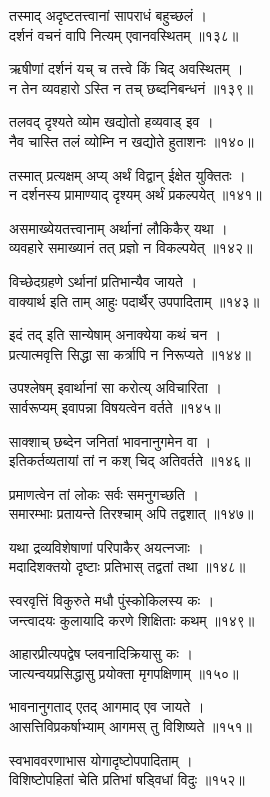 तस्माद् अदृष्टतत्त्वानां सापराधं बहुच्छलं ।\\दर्शनं वचनं वापि नित्यम् एवानवस्थितम् ॥१३८॥

ऋषीणां दर्शनं यच् च तत्त्वे किं चिद् अवस्थितम् ।\\न तेन व्यवहारो ऽस्ति न तच् छब्दनिबन्धनं ॥१३९॥

तलवद् दृश्यते व्योम खद्योतो हव्यवाड् इव ।\\नैव चास्ति तलं व्योम्नि न खद्योते हुताशनः ॥१४०॥

तस्मात् प्रत्यक्षम् अप्य् अर्थं विद्वान् ईक्षेत युक्तितः ।\\न दर्शनस्य प्रामाण्याद् दृश्यम् अर्थं प्रकल्पयेत् ॥१४१॥

असमाख्येयतत्त्वानाम् अर्थानां लौकिकैर् यथा ।\\व्यवहारे समाख्यानं तत् प्रज्ञो न विकल्पयेत् ॥१४२॥

विच्छेदग्रहणे ऽर्थानां प्रतिभान्यैव जायते ।\\वाक्यार्थ इति ताम् आहुः पदार्थैर् उपपादिताम् ॥१४३॥

इदं तद् इति सान्येषाम् अनाक्येया कथं चन ।\\प्रत्यात्मवृत्ति सिद्धा सा कर्त्रापि न निरूप्यते ॥१४४॥

उपश्लेषम् इवार्थानां सा करोत्य् अविचारिता ।\\सार्वरूप्यम् इवापन्ना विषयत्वेन वर्तते ॥१४५॥

साक्शाच् छब्देन जनितां भावनानुगमेन वा ।\\इतिकर्तव्यतायां तां न कश् चिद् अतिवर्तते ॥१४६॥

प्रमाणत्वेन तां लोकः सर्वः समनुगच्छति ।\\समारम्भाः प्रतायन्ते तिरश्चाम् अपि तद्वशात् ॥१४७॥

यथा द्रव्यविशेषाणां परिपाकैर् अयत्नजाः ।\\मदादिशक्तयो दृष्टाः प्रतिभास् तद्वतां तथा ॥१४८॥

स्वरवृत्तिं विकुरुते मधौ पुंस्कोकिलस्य कः ।\\जन्त्वादयः कुलायादि करणे शिक्षिताः कथम् ॥१४९॥

आहारप्रीत्यपद्वेष प्लवनादिक्रियासु कः ।\\जात्यन्वयप्रसिद्धासु प्रयोक्ता मृगपक्षिणाम् ॥१५०॥

भावनानुगताद् एतद् आगमाद् एव जायते ।\\आसत्तिविप्रकर्षाभ्याम् आगमस् तु विशिष्यते ॥१५१॥

स्वभाववरणाभास योगादृष्टोपपादिताम् ।\\विशिष्टोपहितां चेति प्रतिभां षड्विधां विदुः ॥१५२॥

